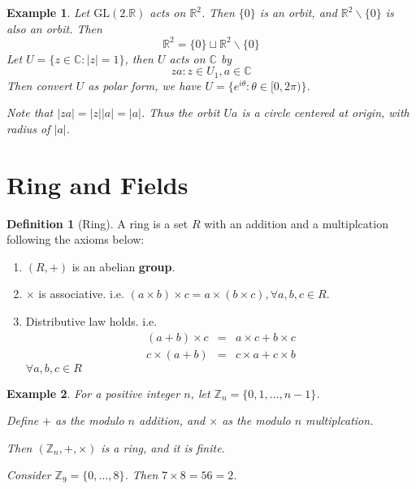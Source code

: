 \documentclass{article}
\theoremstyle{MyNonumberplain}
\theoremstyle{break}
\newcommand{\tmop}{\text}
\theoremstyle{break}
\newtheorem{example}{Example}[section]
\theoremstyle{break}
\theoremstyle{definition}
\theoremstyle{break}
\newtheorem{definition}{Definition}[section]
\begin{document}
\begin{expbox}
    \begin{example}
        Let $\tmop{GL} (2.\mathbb{R})$ acts on $\mathbb{R}^2$. Then $\{ 0 \}$ is an
        orbit, and $\mathbb{R}^2 \backslash \{ 0 \}$ is also an orbit. Then
        \[ \mathbb{R}^2 = \{ 0 \} \sqcup \mathbb{R}^2 \backslash \{ 0 \} \]
        Let $U = \{ z \in \mathbb{C}: | z | = 1 \}$, then $U$ acts on $\mathbb{C}$ by
        \[ z a : z \in U_1, a \in \mathbb{C} \]
        Then convert $U$ as polar form, we have $U = \{ e^{i \theta} : \theta \in [0,
        2 \pi) \}$.\bigskip   

        Note that $| z a | = | z |  | a | = | a |$. Thus the orbit $U a$ is a circle
        centered at origin, with radius of $| a |$.
    \end{example}
\end{expbox}

\newpage

\setcounter{section}{17}

\section{Ring and Fields}

\begin{defbox}
    \begin{definition}[Ring]
        A ring is a set $R$ with an addition and a multiplcation following the axioms
        below:\bigskip
        \begin{enumerate}
        \item $(R, +)$ is an abelian \textbf{group}.\bigskip
        
        \item $\times$ is associative. i.e. $(a \times b) \times c = a \times (b
        \times c), \forall a, b, c \in R$.\bigskip
        
        \item Distributive law holds. i.e.
        \begin{eqnarray*}
            (a + b) \times c & = & a \times c + b \times c\\
            c \times (a + b) & = & c \times a + c \times b
        \end{eqnarray*}
        $\forall a, b, c \in R$
        \end{enumerate}
    \end{definition}
\end{defbox}

\begin{expbox}
    \begin{example}
        For a positive integer $n$, let $\mathbb{Z}_n = \{ 0, 1, \ldots, n - 1 \}$.\bigskip

        Define $+$ as the modulo $n$ addition, and $\times$ as the modulo $n$
        multiplcation.\bigskip

        Then $(\mathbb{Z}_n, +, \times)$ is a ring, and it is finite.\bigskip 

        Consider $\mathbb{Z}_9 = \{ 0, \ldots, 8 \}$. Then $7 \times 8 = 56 = 2$.
    \end{example}
\end{expbox}
\end{document}
